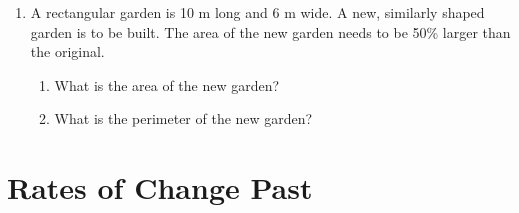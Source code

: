 \documentclass[12pt]{article}
\begin{document}
\begin{enumerate}[resume]
    \vspace{1.2cm}

    \item A rectangular garden is 10 m long and 6 m wide. A new, similarly shaped garden is to be built. The area of the new garden needs to be 50\% larger than the original.
    \begin{enumerate}[label=(\alph*)]
        \item What is the area of the new garden?
        \item What is the perimeter of the new garden?
    \end{enumerate}
    \vspace{1.2cm}
\end{enumerate}


\section*{Rates of Change Past}
\end{document}
